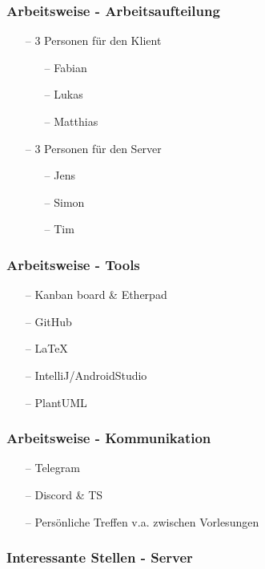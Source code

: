 \documentclass[aspectratio=1610]{beamer}
\begin{document}
  \begin{frame}[plain]
      \frametitle{\textbf{Arbeitsweise - Arbeitsaufteilung}}
      \begin{itemize}
          \setlength\itemsep{0.3em}
          \item[--] 3 Personen für den Klient
              \begin{itemize}
                  \item[--] Fabian
                  \item[--] Lukas
                  \item[--] Matthias
              \end{itemize}
          \item[--] 3 Personen für den Server
              \begin{itemize}
                  \item[--] Jens
                  \item[--] Simon
                  \item[--] Tim
              \end{itemize}
      \end{itemize}
  \end{frame}

  \begin{frame}[plain]
      \frametitle{\textbf{Arbeitsweise - Tools}}
      \begin{itemize}
        \item[--] Kanban board \& Etherpad
        \item[--] GitHub
        \item[--] LaTeX
        \item[--] IntelliJ/AndroidStudio
        \item[--] PlantUML
      \end{itemize}
  \end{frame}

  \begin{frame}[plain]
      \frametitle{\textbf{Arbeitsweise - Kommunikation}}
      \begin{itemize}
        \item[--] Telegram
        \item[--] Discord \& TS
        \item[--] Persönliche Treffen v.a. zwischen Vorlesungen
      \end{itemize}
  \end{frame}

  \begin{frame}[plain]
      \frametitle{\textbf{Interessante Stellen - Server}}
  \end{frame}
\end{document}
